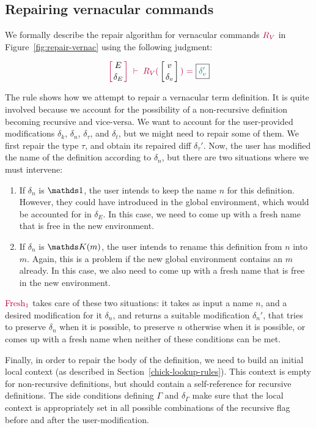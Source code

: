 \subsection{Repairing vernacular commands} \label{repair-vernacular}

We formally describe the repair algorithm for vernacular commands
$\textcolor{purple}{R_{V}}$ in Figure~\ref{fig:repair-vernac} using the following
judgment:

{
  \[
    {\turnstile
      {\denv{E}{\delta_E}}
      {\repairVernac{v}{\delta_v}{\delta_v'}}
    }
  \]
}

\noindent The rule  shows how we attempt to repair a
vernacular term definition.  It is quite involved because we account for the
possibility of a non-recursive definition becoming recursive and vice-versa.  We
want to account for the user-provided modifications $\delta_k$, $\delta_n$,
$\delta_\tau$, and $\delta_t$, but we might need to repair some of them.  We
first repair the type $\tau$, and obtain its repaired diff $\delta_\tau'$.  Now,
the user has modified the name of the definition according to $\delta_n$, but
there are two situations where we must intervene:

\begin{enumerate}

\item If $\delta_n$ is $\MathSame$, the user intends to keep the name $n$ for
this definition.  However, they could have introduced in the global environment,
which would be accounted for in $\delta_E$. In this case, we need to come up
with a fresh name that is free in the new environment.

\item If $\delta_n$ is $\MathReplace{m}$, the user intends to rename this
definition from $n$ into $m$.  Again, this is a problem if the new global
environment contains an $m$ already.  In this case, we also need to come up with
a fresh name that is free in the new environment.

\end{enumerate}

\noindent $\textcolor{purple}{\text{Fresh}_1}$ takes care of these two situations: it takes as input a
name $n$, and a desired modification for it $\delta_n$, and returns a suitable
modification $\delta_n'$, that tries to preserve $\delta_n$ when it is possible,
to preserve $n$ otherwise when it is possible, or comes up with a fresh name
when neither of these conditions can be met.

Finally, in order to repair the body of the definition, we need to build an
initial local context (as described in Section~\ref{chick-lookup-rules}).  This
context is empty for non-recursive definitions, but should contain a
self-reference for recursive definitions.  The side conditions defining $\Gamma$
and $\delta_\Gamma$ make sure that the local context is appropriately set in all
possible combinations of the recursive flag before and after the
user-modification.

